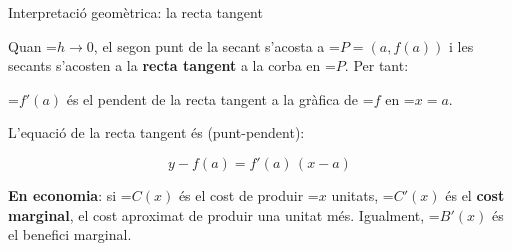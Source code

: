 \documentclass[11pt,a4paper]{article}
\newcommand{\fmm}[1]{\setbox0=\hbox{$#1$}\ifdim\wd0>\linewidth\[#1\]\else\mbox{\box0}\fi}
\newcommand{\fmuline}[1]{\textbf{\color{fmaccent}#1}}
\begin{document}
  
\begin{fmprop}{Interpretació geomètrica: la recta tangent}
\par\noindent \begin{minipage}[t]{0.48\linewidth}\vspace{0pt}\raggedright Quan \fmm{h\to0}, el segon punt de la secant s'acosta a \fmm{P=(a,f(a))} i les secants s'acosten a la \textbf{recta tangent} a la corba en \fmm{P}. Per tant:

          
\begin{center}\colorbox{fmyellow!45}{\parbox{0.9\linewidth}{\centering\strut \fmm{f'(a)} és el pendent de la recta tangent a la gràfica de \fmm{f} en \fmm{x=a}.\strut}}\end{center}

          

L'equació de la recta tangent és (punt-pendent):

          
\[y-f(a)=f'(a)\,(x-a)\]
\end{minipage}\hfill\begin{minipage}[t]{0.48\linewidth}\vspace{0pt}\raggedright \begin{center}\end{center}\end{minipage}\par\medskip

      
\begin{fmnote}\fmuline{En economia}: si \fmm{C(x)} és el cost de produir \fmm{x} unitats, \fmm{C'(x)} és el \textbf{cost marginal}, el cost aproximat de produir una unitat més. Igualment, \fmm{B'(x)} és el benefici marginal.\end{fmnote}
\end{fmprop}
\end{document}

